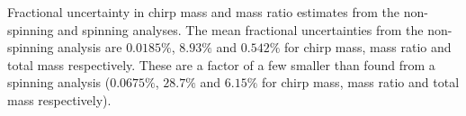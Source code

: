 \label{fig:mass_std} Fractional uncertainty in chirp mass and mass ratio estimates from the non-spinning and spinning analyses.  The mean fractional uncertainties from the non-spinning analysis are $0.0185\%$, $8.93\%$ and $0.542\%$ for chirp mass, mass ratio and total mass respectively.  These are a factor of a few smaller than found from a spinning analysis ($0.0675\%$, $28.7\%$ and $6.15\%$ for chirp mass, mass ratio and total mass respectively).
  